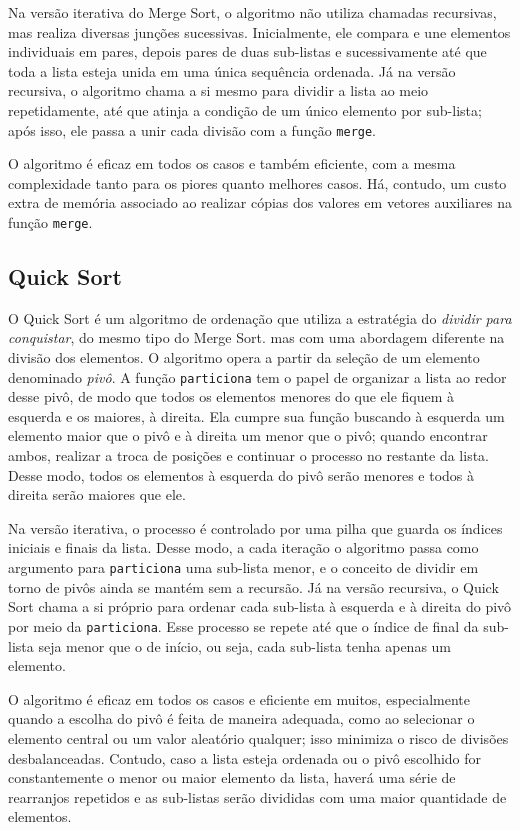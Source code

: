Na versão iterativa do Merge Sort, o algoritmo não utiliza chamadas recursivas, mas realiza diversas junções sucessivas. Inicialmente, ele compara e une elementos individuais em pares, depois pares de duas sub-listas e sucessivamente até que toda a lista esteja unida em uma única sequência ordenada. Já na versão recursiva, o algoritmo chama a si mesmo para dividir a lista ao meio repetidamente, até que atinja a condição de um único elemento por sub-lista; após isso, ele passa a unir cada divisão com a função \texttt{merge}.

O algoritmo é eficaz em todos os casos e também eficiente, com a mesma complexidade tanto para os piores quanto melhores casos. Há, contudo, um custo extra de memória associado ao realizar cópias dos valores em vetores auxiliares na função \texttt{merge}.

\subsection*{Quick Sort}
O Quick Sort é um algoritmo de ordenação que utiliza a estratégia do \textit{dividir para conquistar}, do mesmo tipo do Merge Sort. mas com uma abordagem diferente na divisão dos elementos. O algoritmo opera a partir da seleção de um elemento denominado \textit{pivô}. A função \texttt{particiona} tem o papel de organizar a lista ao redor desse pivô, de modo que todos os elementos menores do que ele fiquem à esquerda e os maiores, à direita. Ela cumpre sua função buscando à esquerda um elemento maior que o pivô e à direita um menor que o pivô; quando encontrar ambos, realizar a troca de posições e continuar o processo no restante da lista. Desse modo, todos os elementos à esquerda do pivô serão menores e todos à direita serão maiores que ele.

Na versão iterativa, o processo é controlado por uma pilha que guarda os índices iniciais e finais da lista. Desse modo, a cada iteração o algoritmo passa como argumento para \texttt{particiona} uma sub-lista menor, e o conceito de dividir em torno de pivôs ainda se mantém sem a recursão. Já na versão recursiva, o Quick Sort chama a si próprio para ordenar cada sub-lista à esquerda e à direita do pivô por meio da \texttt{particiona}. Esse processo se repete até que o índice de final da sub-lista seja menor que o de início, ou seja, cada sub-lista tenha apenas um elemento.

O algoritmo é eficaz em todos os casos e eficiente em muitos, especialmente quando a escolha do pivô é feita de maneira adequada, como ao selecionar o elemento central ou um valor aleatório qualquer; isso minimiza o risco de divisões desbalanceadas. Contudo, caso a lista esteja ordenada ou o pivô escolhido for constantemente o menor ou maior elemento da lista, haverá uma série de rearranjos repetidos e as sub-listas serão divididas com uma maior quantidade de elementos. 
